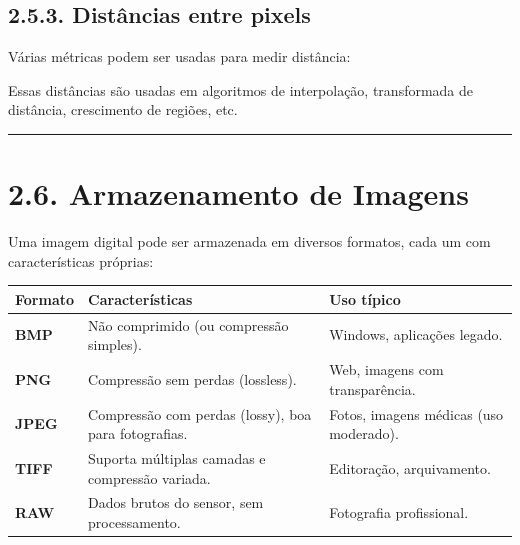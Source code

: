 \documentclass[
  portuguese,
  letterpaper,
  openany,
  oneside,
  12pt,
  a4paper]{book}
\begin{document}
\begin{tcolorbox}
\subsection{2.5.3. Distâncias entre
pixels}\label{distuxe2ncias-entre-pixels}

Várias métricas podem ser usadas para medir distância:

Essas distâncias são usadas em algoritmos de interpolação, transformada
de distância, crescimento de regiões, etc.

\begin{center}\rule{0.5\linewidth}{0.5pt}\end{center}

\section{2.6. Armazenamento de Imagens}\label{armazenamento-de-imagens}

Uma imagem digital pode ser armazenada em diversos formatos, cada um com
características próprias:

\begin{longtable}[]{@{}
  >{\raggedright\arraybackslash}p{}
  >{\raggedright\arraybackslash}p{}
  >{\raggedright\arraybackslash}p{}@{}}
\toprule\noalign{}
\begin{minipage}[b]{\linewidth}\raggedright
Formato
\end{minipage} & \begin{minipage}[b]{\linewidth}\raggedright
Características
\end{minipage} & \begin{minipage}[b]{\linewidth}\raggedright
Uso típico
\end{minipage} \\
\midrule\noalign{}
\endhead
\bottomrule\noalign{}
\endlastfoot
\textbf{BMP} & Não comprimido (ou compressão simples). & Windows,
aplicações legado. \\
\textbf{PNG} & Compressão sem perdas (lossless). & Web, imagens com
transparência. \\
\textbf{JPEG} & Compressão com perdas (lossy), boa para fotografias. &
Fotos, imagens médicas (uso moderado). \\
\textbf{TIFF} & Suporta múltiplas camadas e compressão variada. &
Editoração, arquivamento. \\
\textbf{RAW} & Dados brutos do sensor, sem processamento. & Fotografia
profissional. \\
\end{longtable}


\end{tcolorbox}
\end{document}
